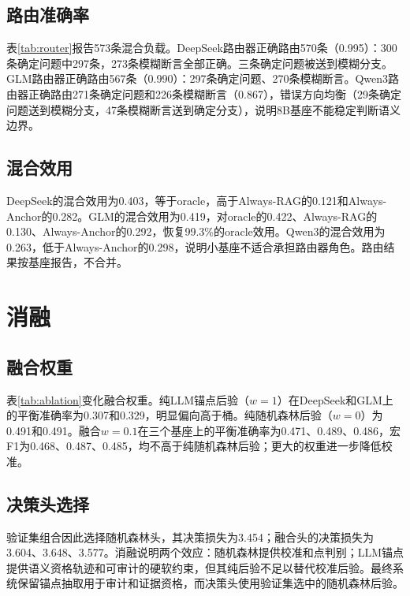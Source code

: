 \subsection{路由准确率}

表\ref{tab:router}报告573条混合负载。DeepSeek路由器正确路由570条（0.995）：300条确定问题中297条，273条模糊断言全部正确。三条确定问题被送到模糊分支。GLM路由器正确路由567条（0.990）：297条确定问题、270条模糊断言。Qwen3路由器正确路由271条确定问题和226条模糊断言（0.867），错误方向均衡（29条确定问题送到模糊分支，47条模糊断言送到确定分支），说明8B基座不能稳定判断语义边界。

\subsection{混合效用}

DeepSeek的混合效用为0.403，等于oracle，高于Always-RAG的0.121和Always-Anchor的0.282。GLM的混合效用为0.419，对oracle的0.422、Always-RAG的0.130、Always-Anchor的0.292，恢复99.3\%的oracle效用。Qwen3的混合效用为0.263，低于Always-Anchor的0.298，说明小基座不适合承担路由器角色。路由结果按基座报告，不合并。



\section{消融}

\subsection{融合权重}

表\ref{tab:ablation}变化融合权重。纯LLM锚点后验（$w=1$）在DeepSeek和GLM上的平衡准确率为0.307和0.329，明显偏向高于桶。纯随机森林后验（$w=0$）为0.491和0.491。融合$w=0.1$在三个基座上的平衡准确率为0.471、0.489、0.486，宏F1为0.468、0.487、0.485，均不高于纯随机森林后验；更大的权重进一步降低校准。

\subsection{决策头选择}

验证集组合因此选择随机森林头，其决策损失为3.454；融合头的决策损失为3.604、3.648、3.577。消融说明两个效应：随机森林提供校准和点判别；LLM锚点提供语义资格轨迹和可审计的硬软约束，但其纯后验不足以替代校准后验。最终系统保留锚点抽取用于审计和证据资格，而决策头使用验证集选中的随机森林后验。



